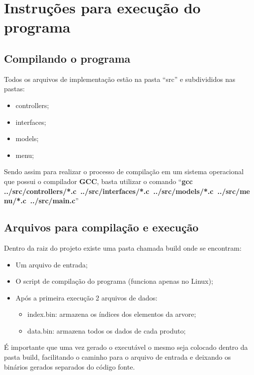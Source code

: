 \documentclass[12pt, a4paper]{article}
\begin{document}
\tableofcontents
\listoffigures
\newpage

\section{Instruções para execução do programa}\label{Instruções para execução do programa}

\subsection{Compilando o programa}\label{Compilando o proograma}
Todos os arquivos de implementação estão na pasta ``src'' e subdivididos nas pastas:
\begin{itemize}
    \item controllers;
    \item interfaces;
    \item models;
    \item menu;
\end{itemize}
Sendo assim para realizar o processo de compilação em um sistema operacional que possui o compilador \textbf{GCC}, basta utilizar o comando ``\textbf{gcc ../src/controllers/*.c~../src/interfaces/*.c~../src/models/*.c~../src/menu/*.c~../src/main.c}''

\subsection{Arquivos para compilação e execução}\label{Arquivos para compilação e execução}
Dentro da raiz do projeto existe uma pasta chamada build onde se encontram:
\begin{itemize}
    \item Um arquivo de entrada;
    \item O script de compilação do programa (funciona apenas no Linux);
    \item Após a primeira execução 2 arquivos de dados:
        \begin{itemize}
            \item index.bin: armazena os índices dos elementos da arvore;
            \item data.bin: armazena todos os dados de cada produto;
        \end{itemize}
\end{itemize}

É importante que uma vez gerado o executável o mesmo seja colocado dentro da pasta build, facilitando o caminho para o arquivo de entrada e deixando os binários gerados separados do código fonte.
\end{document}
